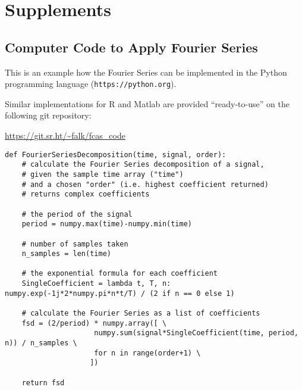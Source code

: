 \FloatBarrier\clearpage
\section{Supplements}
\label{appendix}
\subsection{Computer Code to Apply Fourier Series}
\label{appendix:code}
This is an example how the Fourier Series can be implemented in the Python programming language (\nolinkurl{https://python.org}).

Similar implementations for R and Matlab are provided ``ready-to-use'' on the following git repository:

\url{https://git.sr.ht/~falk/fcas_code}



\begin{lstlisting}
def FourierSeriesDecomposition(time, signal, order):
    # calculate the Fourier Series decomposition of a signal,
    # given the sample time array ("time")
    # and a chosen "order" (i.e. highest coefficient returned)
    # returns complex coefficients

    # the period of the signal
    period = numpy.max(time)-numpy.min(time)

    # number of samples taken
    n_samples = len(time)

    # the exponential formula for each coefficient
    SingleCoefficient = lambda t, T, n: numpy.exp(-1j*2*numpy.pi*n*t/T) / (2 if n == 0 else 1)

    # calculate the Fourier Series as a list of coefficients
    fsd = (2/period) * numpy.array([ \
                     numpy.sum(signal*SingleCoefficient(time, period, n)) / n_samples \
                     for n in range(order+1) \
                    ])

    return fsd

\end{lstlisting}


